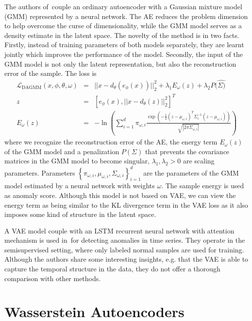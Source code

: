 The authors of\,\cite{zong2018deep} couple an ordinary autoencoder
with a Gaussian mixture model (GMM) represented by a neural network.
The AE reduces the problem dimension to help overcome the curse of
dimensionality, while the GMM model serves as a density estimate in
the latent space. The novelty of the method is in two facts. Firstly,
instead of training parameters of both models separately, they are
learnt jointly which improves the performance of the model. Secondly,
the input of the GMM model is not only the latent representation,
but also the reconstruction error of the sample. The loss is 
\begin{eqnarray}
\mathcal{L}_{\text{DAGMM}}(x,\phi,\theta,\omega) & = & ||x-d_{\theta}(e_{\phi}(x))||_{2}^{2}+\lambda_{1}E_{\omega}(z)+\lambda_{2}P(\hat{\Sigma)}\\
z & = & \left[e_{\phi}(x),||x-d_{\theta}(z)||_{2}^{2}\right]^{T}\\
E_{\omega}(z) & = & -\ln\left(\sum_{i=1}^{d}\pi_{\omega,i}\frac{\exp\left(-\frac{1}{2}(z-\mu_{\omega,i})^{T}\Sigma_{i}^{-1}(z-\mu_{\omega,i})\right)}{\sqrt{|2\pi\Sigma_{\omega,i}|}}\right)
\end{eqnarray}
where we recognize the reconstruction error of the AE, the energy
term $E_{\omega}(z)$ of the GMM model and a penalization $P(\Sigma)$
that prevents the covariance matrices in the GMM model to become singular,
$\lambda_{1},\lambda_{2}>0$ are scaling parameters. Parameters $\left\{ \pi_{\omega,i},\mu_{\omega,i},\Sigma_{\omega,i}\right\} _{i=1}^{d}$
are the parameters of the GMM model estimated by a neural network
with weights $\omega$. The sample energy is used as anomaly score.
Although this model is not based on VAE, we can view the energy term
as being similar to the KL divergence term in the VAE loss as it also
imposes some kind of structure in the latent space.

A VAE model couple with an LSTM recurrent neural network with attention
mechanism is used in\,\cite{pereira2018unsupervised} for detecting
anomalies in time series. They operate in the semisupervised setting,
where only labeled normal samples are used for training. Although
the authors share some interesting insights, e.g. that the VAE is
able to capture the temporal structure in the data, they do not offer
a thorough comparison with other methods.


\section{Wasserstein Autoencoders}

